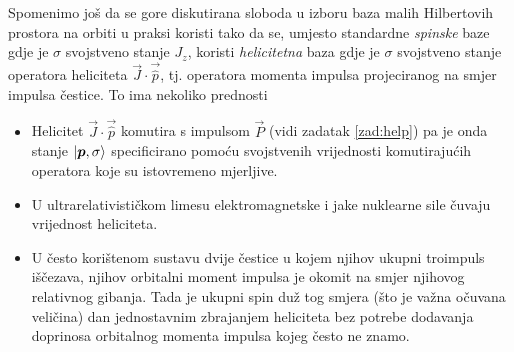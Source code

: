 Spomenimo još da se gore diskutirana sloboda u izboru baza malih Hilbertovih
prostora na orbiti u praksi koristi tako da se, umjesto standardne \emph{spinske}
baze gdje je $\sigma$ svojstveno stanje $J_z$,
koristi \emph{helicitetna} baza gdje je $\sigma$ svojstveno stanje operatora
heliciteta $\vec{J}\cdot\vec{\hat{p}}$, tj. operatora momenta impulsa projeciranog na smjer
impulsa čestice. To ima nekoliko prednosti
\begin{itemize}
    \item Helicitet $\vec{J}\cdot\vec{\hat{p}}$ komutira s impulsom $\vec{P}$ 
        (vidi zadatak \ref{zad:help}) pa je onda stanje $\ket{\vec{p}, \sigma}$
        specificirano pomoću svojstvenih vrijednosti komutirajućih operatora koje
        su istovremeno mjerljive.

   \item U ultrarelativističkom limesu elektromagnetske i jake nuklearne sile
       čuvaju vrijednost heliciteta.

   \item U često korištenom sustavu dvije čestice u kojem njihov ukupni troimpuls
       iščezava, njihov orbitalni moment impulsa je okomit na smjer njihovog
       relativnog gibanja. Tada je ukupni spin duž tog smjera (što je važna očuvana veličina)
       dan jednostavnim zbrajanjem heliciteta bez potrebe dodavanja doprinosa
       orbitalnog momenta impulsa kojeg često ne znamo.
\end{itemize}

